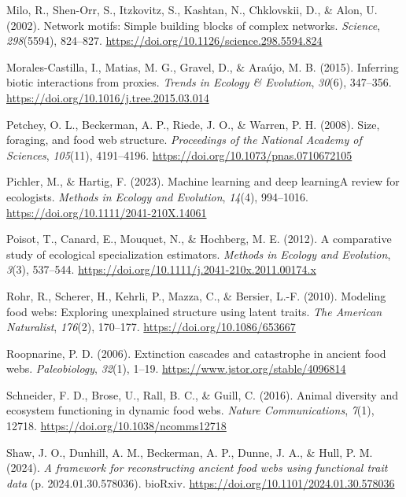 \documentclass[
]{article}
\newlength{\cslhangindent}
\newenvironment{CSLReferences}[2] %
 {\begin{list}{}{%
  \setlength{\itemindent}{0pt}
  \setlength{\leftmargin}{0pt}
  \setlength{\parsep}{0pt}
  \ifodd #1
   \setlength{\leftmargin}{\cslhangindent}
   \setlength{\itemindent}{-1\cslhangindent}
  \fi
  \setlength{\itemsep}{#2\baselineskip}}}
 {\end{list}}
\begin{document}
\begin{CSLReferences}{1}{0}
Milo, R., Shen-Orr, S., Itzkovitz, S., Kashtan, N., Chklovskii, D., \&
Alon, U. (2002). Network motifs: Simple building blocks of complex
networks. \emph{Science}, \emph{298}(5594), 824--827.
\url{https://doi.org/10.1126/science.298.5594.824}

Morales-Castilla, I., Matias, M. G., Gravel, D., \& Araújo, M. B.
(2015). Inferring biotic interactions from proxies. \emph{Trends in
Ecology \& Evolution}, \emph{30}(6), 347--356.
\url{https://doi.org/10.1016/j.tree.2015.03.014}

Petchey, O. L., Beckerman, A. P., Riede, J. O., \& Warren, P. H. (2008).
Size, foraging, and food web structure. \emph{Proceedings of the
National Academy of Sciences}, \emph{105}(11), 4191--4196.
\url{https://doi.org/10.1073/pnas.0710672105}

Pichler, M., \& Hartig, F. (2023). Machine learning and deep
learning{\textemdash}A review for ecologists. \emph{Methods in Ecology
and Evolution}, \emph{14}(4), 994--1016.
\url{https://doi.org/10.1111/2041-210X.14061}

Poisot, T., Canard, E., Mouquet, N., \& Hochberg, M. E. (2012). A
comparative study of ecological specialization estimators. \emph{Methods
in Ecology and Evolution}, \emph{3}(3), 537--544.
\url{https://doi.org/10.1111/j.2041-210x.2011.00174.x}

Rohr, R., Scherer, H., Kehrli, P., Mazza, C., \& Bersier, L.-F. (2010).
Modeling food webs: Exploring unexplained structure using latent traits.
\emph{The American Naturalist}, \emph{176}(2), 170--177.
\url{https://doi.org/10.1086/653667}

Roopnarine, P. D. (2006). Extinction cascades and catastrophe in ancient
food webs. \emph{Paleobiology}, \emph{32}(1), 1--19.
\url{https://www.jstor.org/stable/4096814}

Schneider, F. D., Brose, U., Rall, B. C., \& Guill, C. (2016). Animal
diversity and ecosystem functioning in dynamic food webs. \emph{Nature
Communications}, \emph{7}(1), 12718.
\url{https://doi.org/10.1038/ncomms12718}

Shaw, J. O., Dunhill, A. M., Beckerman, A. P., Dunne, J. A., \& Hull, P.
M. (2024). \emph{A framework for reconstructing ancient food webs using
functional trait data} (p. 2024.01.30.578036). bioRxiv.
\url{https://doi.org/10.1101/2024.01.30.578036}


\end{CSLReferences}
\end{document}
